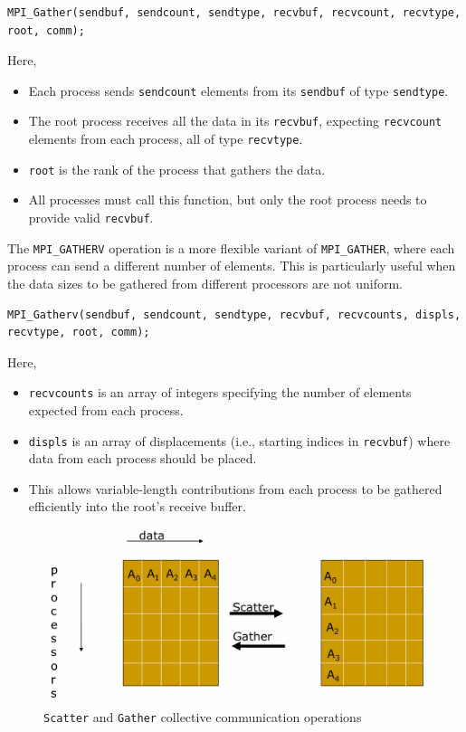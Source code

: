 \documentclass[12pt]{book}
\begin{document}
\begin{lstlisting}[style=cppstyle]
MPI_Gather(sendbuf, sendcount, sendtype, recvbuf, recvcount, recvtype, root, comm);
\end{lstlisting}

Here,
\begin{itemize}
    \item Each process sends \texttt{sendcount} elements from its \texttt{sendbuf} of type \texttt{sendtype}.
    \item The root process receives all the data in its \texttt{recvbuf}, expecting \texttt{recvcount} elements from each process, all of type \texttt{recvtype}.
    \item \texttt{root} is the rank of the process that gathers the data.
    \item All processes must call this function, but only the root process needs to provide valid \texttt{recvbuf}.
\end{itemize}

\vspace{1em}
The \texttt{MPI\_GATHERV} operation is a more flexible variant of \texttt{MPI\_GATHER}, where each process can send a different number of elements. This is particularly useful when the data sizes to be gathered from different processors are not uniform.

\begin{lstlisting}[style=cppstyle]
MPI_Gatherv(sendbuf, sendcount, sendtype, recvbuf, recvcounts, displs, recvtype, root, comm);
\end{lstlisting}

Here,
\begin{itemize}
    \item \texttt{recvcounts} is an array of integers specifying the number of elements expected from each process.
    \item \texttt{displs} is an array of displacements (i.e., starting indices in \texttt{recvbuf}) where data from each process should be placed.
    \item This allows variable-length contributions from each process to be gathered efficiently into the root's receive buffer.
\end{itemize}
\begin{figure}[ht]
    \centering
    \includegraphics[width=0.75\linewidth]{images/scatter_gather.png}
    \caption{\texttt{Scatter} and \texttt{Gather} collective communication operations}
    \label{fig:scattergather}
\end{figure}
\end{document}
